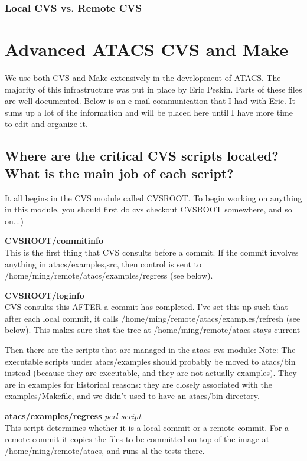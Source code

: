 \documentclass[titlepage,11pt]{article}
\begin{document}
  \subsubsection{Local CVS vs. Remote CVS}  
  
  \section{Advanced ATACS CVS and Make}
  We use both CVS and Make extensively in the development of ATACS.
  The majority of this infrastructure was put in place by Eric
  Peskin.  Parts of these files are well documented.  Below is an
  e-mail communication that I had with Eric.  It sums up a lot of the
  information and will be placed here until I have more time to edit
  and organize it.

  \subsection{Where are the critical CVS scripts located?  What is the
    main job of each script?}
  
  It all begins in the CVS module called CVSROOT.  To begin working on
  anything in this module, you should first do cvs checkout CVSROOT
  somewhere, and so on...)
  
  \textbf{CVSROOT/commitinfo}\\
  This is the first thing that CVS consults before a commit.  If the
  commit involves anything in atacs/{examples,src}, then control is sent
  to /home/ming/remote/atacs/examples/regress (see below).
  
  \textbf{CVSROOT/loginfo}\\
  CVS consults this AFTER a commit has completed.  I've set this up such
  that after each local commit, it calls
  /home/ming/remote/atacs/examples/refresh (see below).  This makes sure
  that the tree at /home/ming/remote/atacs stays current
  
  
  Then there are the scripts that are managed in the atacs cvs module:
  Note: The executable scripts under atacs/examples should probably be
  moved to atacs/bin instead (because they are executable, and they
  are not actually examples).  They are in examples for historical
  reasons: they are closely associated with the examples/Makefile, and
  we didn't used to have an atacs/bin directory.
  
  \textbf{atacs/examples/regress}  \emph{perl script}\\
  This script determines whether it is a local commit or a remote
  commit.  For a remote commit it copies the files to be committed on
  top of the image at /home/ming/remote/atacs, and runs al the tests
  there.
  
\end{document}
